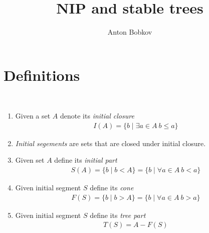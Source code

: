 \documentclass{amsart}
\begin{document}
\title{NIP and stable trees}
\author{Anton Bobkov}

\maketitle

\section{Definitions}

\begin{Definition}\ 
	\begin{enumerate}
		\item Given a set $A$ denote its \emph{initial closure} 
		\begin{align*}
			I(A) = \{b \mid \exists a \in A \ b \leq a\}
		\end{align*}
		\item \emph{Initial segements} are sets that are closed under initial closure.
		\item Given set $A$ define its \emph{initial part}
		\begin{align*}
			S(A) = \{b \mid b < A\} = \{b \mid \forall a \in A \ b < a\}
		\end{align*}
		\item Given initial segment $S$ define its \emph{cone}
		\begin{align*}
			F(S) = \{b \mid b > A\} = \{b \mid \forall a \in A \ b > a\}
		\end{align*}
		\item Given initial segment $S$ define its \emph{tree part}
		\begin{align*}
			T(S) = A - F(S)
		\end{align*}
	\end{enumerate}
\end{Definition}
\end{document}

